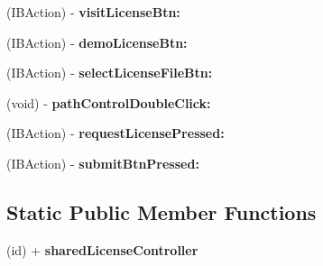 \begin{DoxyCompactItemize}
\item 
\hypertarget{interface_license_controller_af56c6580f6943f299c554f72c4f71831}{
(IBAction) -\/ {\bfseries visitLicenseBtn:}}
\label{interface_license_controller_af56c6580f6943f299c554f72c4f71831}

\item 
\hypertarget{interface_license_controller_a041776c38b8b1b0020a496ab44bd8a64}{
(IBAction) -\/ {\bfseries demoLicenseBtn:}}
\label{interface_license_controller_a041776c38b8b1b0020a496ab44bd8a64}

\item 
\hypertarget{interface_license_controller_a62be01656891868891ad2867271f2184}{
(IBAction) -\/ {\bfseries selectLicenseFileBtn:}}
\label{interface_license_controller_a62be01656891868891ad2867271f2184}

\item 
\hypertarget{interface_license_controller_ab9b4ff77f94f9af33a85699de8210e13}{
(void) -\/ {\bfseries pathControlDoubleClick:}}
\label{interface_license_controller_ab9b4ff77f94f9af33a85699de8210e13}

\item 
\hypertarget{interface_license_controller_a05f70a5f4d4e1bce95f962be9a73df15}{
(IBAction) -\/ {\bfseries requestLicensePressed:}}
\label{interface_license_controller_a05f70a5f4d4e1bce95f962be9a73df15}

\item 
\hypertarget{interface_license_controller_a8742baeaea259c8fb373a8bb76569a80}{
(IBAction) -\/ {\bfseries submitBtnPressed:}}
\label{interface_license_controller_a8742baeaea259c8fb373a8bb76569a80}

\end{DoxyCompactItemize}
\subsection*{Static Public Member Functions}
\begin{DoxyCompactItemize}
\item 
\hypertarget{interface_license_controller_a0769e1d5addbe8b34e065e460369f00d}{
(id) + {\bfseries sharedLicenseController}}
\label{interface_license_controller_a0769e1d5addbe8b34e065e460369f00d}

\end{DoxyCompactItemize}
